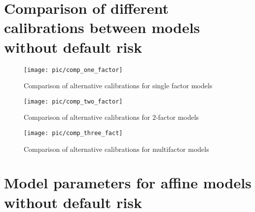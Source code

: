 \section{Comparison of different calibrations between models without default risk}

\begin{figure}[H]
	\centering
	\texttt{[image: pic/comp\_one\_factor]}
	\caption{Comparison of alternative calibrations for single factor models}
	\label{fig:comp_one_factor}
\end{figure}

\begin{figure}[H]
	\centering
	\texttt{[image: pic/comp\_two\_factor]}
	\caption{Comparison of alternative calibrations for $2$-factor models}
	\label{fig:comp_two_factor}
\end{figure}

\begin{figure}[H]
	\centering
	\texttt{[image: pic/comp\_three\_fact]}
	\caption{Comparison of alternative calibrations for multifactor models}
	\label{fig:comp_three_factor}
\end{figure}

\pagebreak


\section{Model parameters for affine models without default risk}

